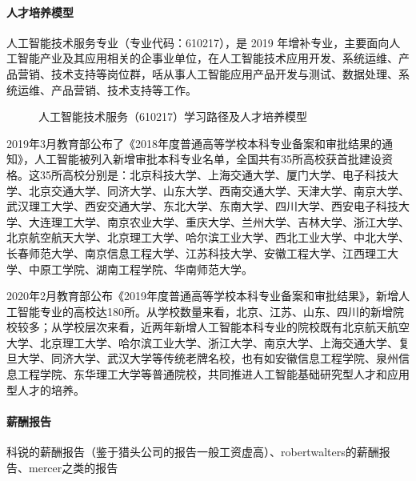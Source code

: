 \documentclass[letterpaper,11pt,english]{sphinxmanual}
\begin{document}
\paragraph{人才培养模型}
\label{\detokenize{chapter_project/AI_talents:id15}}
人工智能技术服务专业（专业代码：610217），是 2019
年增补专业，主要面向人工智能产业及其应用相关的企事业单位，在人工智能技术应用开发、系统运维、产品营销、技术支持等岗位群，咶从事人工智能应用产品开发与测试、数据处理、系统运维、产品营销、技术支持等工作。

\begin{figure}[H]
\centering
\capstart

\noindent{}
\caption{人工智能技术服务（610217）学习路径及人才培养模型}\label{\detokenize{chapter_project/AI_talents:id23}}\end{figure}

2019年3月教育部公布了《2018年度普通高等学校本科专业备案和审批结果的通知》，人工智能被列入新增审批本科专业名单，全国共有35所高校获首批建设资格。这35所高校分别是：北京科技大学、上海交通大学、厦门大学、电子科技大学、北京交通大学、同济大学、山东大学、西南交通大学、天津大学、南京大学、武汉理工大学、西安交通大学、东北大学、东南大学、四川大学、西安电子科技大学、大连理工大学、南京农业大学、重庆大学、兰州大学、吉林大学、浙江大学、北京航空航天大学、北京理工大学、哈尔滨工业大学、西北工业大学、中北大学、长春师范大学、南京信息工程大学、江苏科技大学、安徽工程大学、江西理工大学、中原工学院、湖南工程学院、华南师范大学。

2020年2月教育部公布《2019年度普通高等学校本科专业备案和审批结果》，新增人工智能专业的高校达180所。从学校数量来看，北京、江苏、山东、四川的新增院校较多；从学校层次来看，近两年新增人工智能本科专业的院校既有北京航天航空大学、北京理工大学、哈尔滨工业大学、浙江大学、南京大学、上海交通大学、复旦大学、同济大学、武汉大学等传统老牌名校，也有如安徽信息工程学院、泉州信息工程学院、东华理工大学等普通院校，共同推进人工智能基础研究型人才和应用型人才的培养。%
\begin{footnote}[677]\sphinxAtStartFootnote
{}
%
\end{footnote}


\paragraph{薪酬报告}
\label{\detokenize{chapter_project/AI_talents:id16}}
科锐的薪酬报告（鉴于猎头公司的报告一般工资虚高）、robertwalters的薪酬报告、mercer之类的报告
%
\begin{footnote}[678]\sphinxAtStartFootnote
{}
%
\end{footnote}
\end{document}
